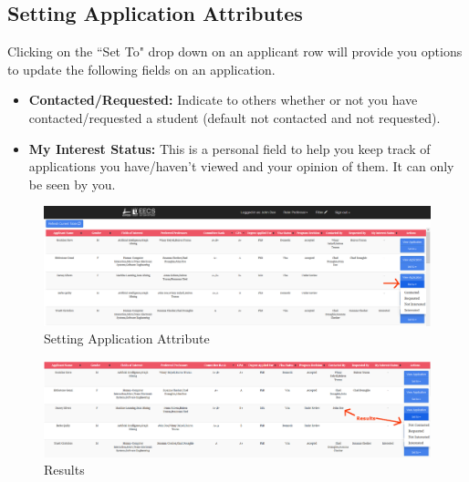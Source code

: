 \documentclass[fontsize=12pt,paper=letter,twoside]{scrartcl}
\begin{document}
\subsection{Setting Application Attributes}
Clicking on the ``Set To" drop down on an applicant row will provide you options to update the following fields on an application.
\begin{itemize}
\item \textbf{Contacted/Requested:} Indicate to others whether or not you have contacted/requested a student (default not contacted and not requested).
\item \textbf{My Interest Status:} This is a personal field to help you keep track of applications you have/haven't viewed and your opinion of them. It can only be seen by you.
\end{itemize}

\begin{figure}[!htb]
\begin{center}
\includegraphics[width=.99\textwidth]{images/set_attribute.png}
\end{center}
\caption{Setting Application Attribute}
\label{fig:set_attribute}
\end{figure}

\begin{figure}[!htb]
\begin{center}
\includegraphics[width=.99\textwidth]{images/set_attribute2.png}
\end{center}
\caption{Results}
\label{fig:set_attribute_results}
\end{figure}
\end{document}
